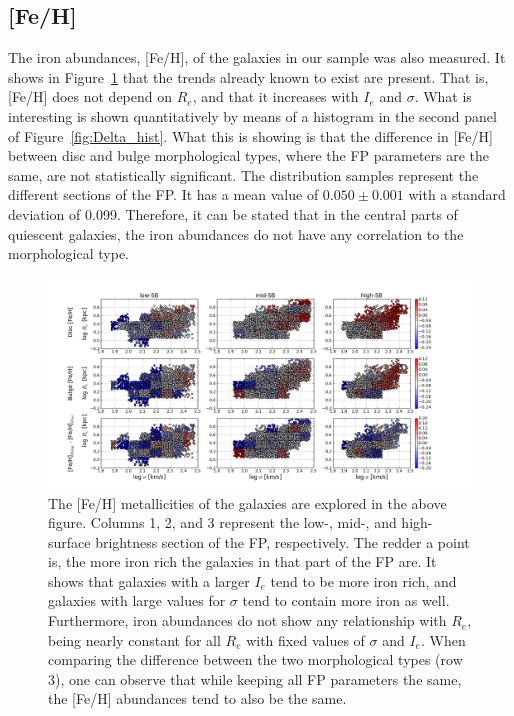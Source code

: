 \documentclass[showcase, preprintnumbers, amsmath, amssymb, bibnotes, 12pt]{revtex4}
\begin{document}
\subsection{[Fe/H]}


The iron abundances, [Fe/H], of the galaxies in our sample was also measured. It shows in Figure~\ref{fig:FeH_maps} that the trends already known to exist are present. That is, [Fe/H] does not depend on $R_e$, and that it increases with $I_e$ and $\sigma$. What is interesting is shown quantitatively by means of a histogram in the second panel of Figure~\ref{fig:Delta_hist}. What this is showing is that the difference in [Fe/H] between disc and bulge morphological types, where the FP parameters are the same, are not statistically significant. The distribution samples represent the different sections of the FP. It has a mean value of $0.050\pm0.001$ with a standard deviation of 0.099. Therefore, it can be stated that in the central parts of quiescent galaxies, the iron abundances do not have any correlation to the morphological type.  

\begin{figure}
\begin{center}
\includegraphics[scale=0.43]{FeH_map_9panel.png}
\end{center}
\caption{The [Fe/H] metallicities of the galaxies are explored in the above figure. Columns 1, 2, and 3 represent the low-, mid-, and high-surface brightness section of the FP, respectively. The redder a point is, the more iron rich the galaxies in that part of the FP are. It shows that galaxies with a larger $I_e$ tend to be more iron rich, and galaxies with large values for $\sigma$  tend to contain more iron as well. Furthermore, iron abundances do not show any relationship with $R_e$, being nearly constant for all $R_e$ with fixed values of $\sigma$ and $I_e$. When comparing the difference between the two morphological types (row 3), one can observe that while keeping all FP parameters the same, the [Fe/H] abundances tend to also be the same. \label{fig:FeH_maps}}
\end{figure}
\end{document}
